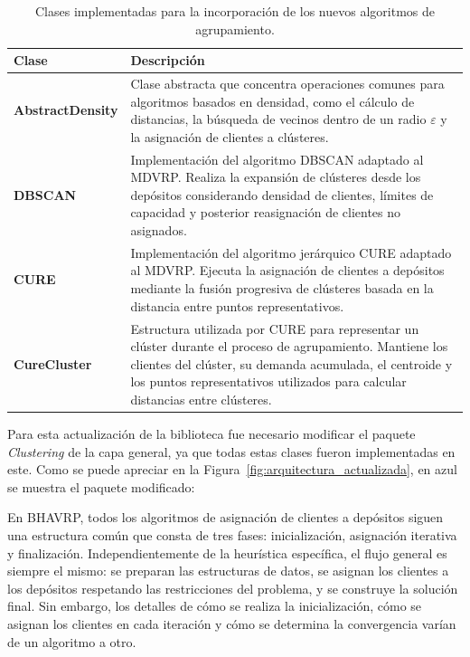 \begin{table}[H]
\centering
\caption{Clases implementadas para la incorporaci\'on de los nuevos algoritmos de agrupamiento.}
\label{tab:clases}
\small
\begin{tabular}{@{}lp{10cm}@{}}
\toprule
\textbf{Clase} & \textbf{Descripci\'on} \\
\midrule
\textbf{AbstractDensity} & Clase abstracta que concentra operaciones comunes para algoritmos basados en densidad, como el c\'alculo de distancias, la b\'usqueda de vecinos dentro de un radio $\varepsilon$ y la asignaci\'on de clientes a cl\'usteres. \\
\textbf{DBSCAN} & Implementaci\'on del algoritmo DBSCAN adaptado al MDVRP. Realiza la expansi\'on de cl\'usteres desde los dep\'ositos considerando densidad de clientes, l\'imites de capacidad y posterior reasignaci\'on de clientes no asignados. \\
\textbf{CURE} & Implementaci\'on del algoritmo jer\'arquico CURE adaptado al MDVRP. Ejecuta la asignaci\'on de clientes a dep\'ositos mediante la fusi\'on progresiva de cl\'usteres basada en la distancia entre puntos representativos. \\
\textbf{CureCluster} & Estructura utilizada por CURE para representar un cl\'uster durante el proceso de agrupamiento. Mantiene los clientes del cl\'uster, su demanda acumulada, el centroide y los puntos representativos utilizados para calcular distancias entre cl\'usteres. \\
\bottomrule
\end{tabular}
\end{table}

Para esta actualizaci\'on de la biblioteca fue necesario modificar el paquete \textit{Clustering} de la capa general, ya que todas estas clases fueron implementadas en este. Como se puede apreciar en la Figura~\ref{fig:arquitectura_actualizada}, en azul se muestra el paquete modificado:


En BHAVRP, todos los algoritmos de asignaci\'on de clientes a dep\'ositos siguen una estructura com\'un que consta de tres fases: inicializaci\'on, asignaci\'on iterativa y finalizaci\'on. Independientemente de la heur\'istica espec\'ifica, el flujo general es siempre el mismo: se preparan las estructuras de datos, se asignan los clientes a los dep\'ositos respetando las restricciones del problema, y se construye la soluci\'on final. Sin embargo, los detalles de c\'omo se realiza la inicializaci\'on, c\'omo se asignan los clientes en cada iteraci\'on y c\'omo se determina la convergencia var\'ian de un algoritmo a otro.

